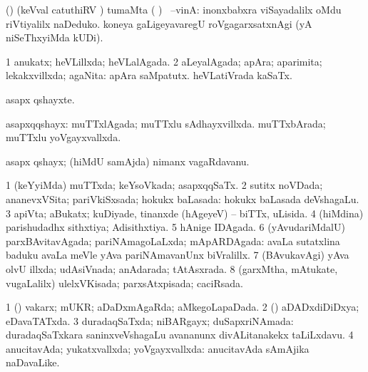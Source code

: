 {{\bentry
{} 
\gl{\upa}
\expl{}
\bmng
(\pArxparx)  (keVval catuthiRV \parx) tumaMta ( ) \parx\ --vinA:  inonxbabxra viSayadalilx oMdu riVtiyalilx naDeduko.  koneya gaLigeyavaregU roVgagarxsatxnAgi (yA niSeThxyiMda kUDi). 
\emng

\noindent
\gl{\pagu}
\expl{}
\bmng
{} 
\emng
\eentry

\bentry
{} 
\gl{\gu}
\expl{}
\bmng
\bnum
\num{1} anukatx; heVLillxda; heVLalAgada. 
\num{2} aLeyalAgada; apAra; aparimita; lekakxvillxda; agaNita:  apAra saMpatutx.  heVLatiVrada kaSaTx. 
\enum
\emng
\eentry

\bentry
{} 
\gl{\nA}
\expl{}
\bmng
asapx qshayxte. 
\emng
\eentry

\bentry
{} 
\gl{\gu}
\expl{}
\bmng
asapxqqshayx: 
\banum
{} muTTxlAgada; muTTxlu sAdhayxvillxda. 
 muTTxbArada; muTTxlu yoVgayxvallxda. 
\eanum
\emng
\eentry

\bentry
{} 
\gl{\nA}
\expl{}
\bmng
asapx qshayx; (hiMdU samAjda) nimanx vagaRdavanu. 
\emng
\eentry

\bentry
{} 
\gl{\nA}
\expl{}
\bmng
{} 
\emng
\eentry

\bentry
{} 
\gl{\gu}
\expl{}
\bmng
\bnum
\num{1} (keYyiMda) muTTxda; keYsoVkada; asapxqqSaTx. 
\num{2} sutitx noVDada; ananevxVSita; pariVkiSxsada; hokukx baLasada:  hokukx baLasada deVshagaLu. 
\num{3} apiVta; aBukatx; kuDiyade, tinanxde (hAgeyeV) -- biTTx, uLisida. 
\num{4} (hiMdina) parishudadhx sithxtiya; Adisithxtiya. 
\num{5} hAnige IDAgada. 
\num{6} (yAvudariMdalU) parxBAvitavAgada; pariNAmagoLaLxda; mApARDAgada:  avaLa sutatxlina baduku avaLa meVle yAva pariNAmavanUnx biVralillx. 
\num{7} (BAvukavAgi) yAva olvU illxda; udAsiVnada; anAdarada; tAtAsxrada. 
\num{8} (garxMtha, mAtukate, \mo vugaLalilx) ulelxVKisada; parxsAtxpisada; caciRsada. 
\enum
\emng
\eentry

\bentry
{} 
\gl{\gu}
\expl{}
\bmng
\bnum
\num{1} (\pArxparx) vakarx; mUKR; aDaDxmAgaRda; aMkegoLapaDada. 
\num{2} (\gaparx) aDADxdiDiDxya; eDavaTATxda. 
\num{3} duradaqSaTxda; niBARgayx; duSapxriNAmada:  duradaqSaTxkara saninxveVshagaLu avananunx divALitanakekx taLiLxdavu. 
\num{4} anucitavAda; yukatxvallxda; yoVgayxvallxda:  anucitavAda sAmAjika naDavaLike. 
\enum
\emng
\eentry

}}
